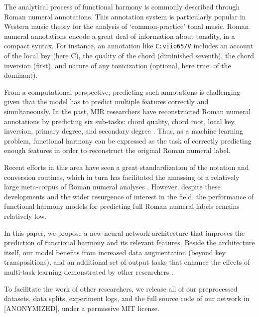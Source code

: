 The analytical process of functional harmony is commonly described through Roman numeral annotations. 
This annotation system is particularly popular in Western music theory for the analysis of `common-practice' tonal music.
Roman numeral annotations encode a great deal of information about tonality, in a compact syntax.
For instance, an annotation like  \texttt{C:viio65/V} includes an account of the local key (here C), the quality of the chord (diminished seventh), the chord inversion (first), and nature of any tonicization (optional, here true: of the dominant). 

From a computational perspective, predicting such annotations is challenging given that the model has to predict multiple features correctly and simultaneously. 
In the past, MIR researchers have reconstructed Roman numeral annotations by predicting six sub-tasks: chord quality, chord root, local key, inversion, primary degree, and secondary degree \cite{chen_functional_2018, micchi_not_2020}. 
%
Thus, as a machine learning problem, functional harmony can be expressed as the task of correctly predicting enough features in order to reconstruct the original Roman numeral label. 


Recent efforts in this area have seen a great standardization of the notation and conversion routines, \cite{gotham_romantext_2019} which in turn has facilitated the amassing of a relatively large meta-corpus of Roman numeral analyses \cite{gotham_romantext_2019}.
However, despite these developments and the wider resurgence of interest in the field, the performance of functional harmony models for predicting full Roman numeral labels remains relatively low.

In this paper, we propose a new neural network architecture that improves the prediction of functional harmony and its relevant features. 
Beside the architecture itself, our model benefits from increased data augmentation (beyond key transpositions), and an additional set of output tasks that enhance the effects of multi-task learning demonstrated by other researchers \cite{chen_functional_2018}.

To facilitate the work of other researchers, we release all of our preprocessed datasets, data splits, experiment logs, and the full source code of our network in [ANONYMIZED], under a permissive MIT license.


